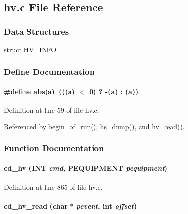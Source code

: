 \subsection{hv.c File Reference}
\label{hv_8c}
\subsubsection*{Data Structures}
\begin{DoxyCompactItemize}
\item 
struct \hyperlink{structHV__INFO}{HV\_\-INFO}
\end{DoxyCompactItemize}


\subsubsection{Define Documentation}
\paragraph[{abs}]{\setlength{\rightskip}{0pt plus 5cm}\#define abs(a)~(((a) $<$ 0)   ? -\/(a) : (a))}\hfill\label{hv_8c_a6a010865b10e541735fa2da8f3cd062d}


Definition at line 59 of file hv.c.

Referenced by begin\_\-of\_\-run(), hs\_\-dump(), and hv\_\-read().

\subsubsection{Function Documentation}
\paragraph[{cd\_\-hv}]{ cd\_\-hv ({\bf INT} {\em cmd}, \/  {\bf PEQUIPMENT} {\em pequipment})}\hfill\label{hv_8c_af6fe77dbe946ebf6e925982d50d0db3c}


Definition at line 865 of file hv.c.
\paragraph[{cd\_\-hv\_\-read}]{ cd\_\-hv\_\-read (char $\ast$ {\em pevent}, \/  int {\em offset})}\hfill\label{hv_8c_aa5383a81945ebd5e43ca55dcd4d6b07b}


